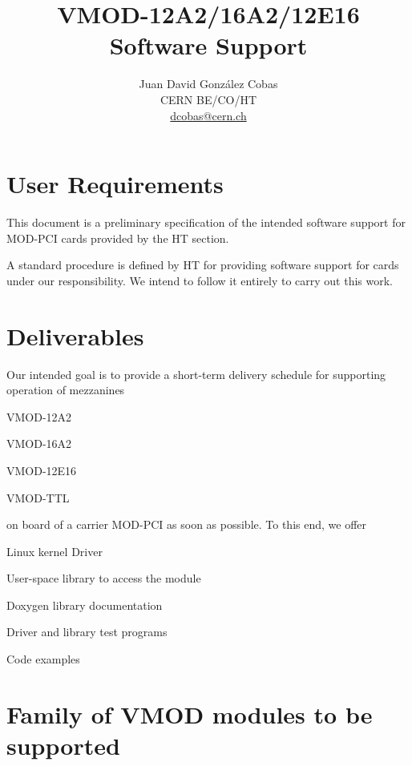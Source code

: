 \documentclass[11pt,a4paper]{article}
\title{VMOD-12A2/16A2/12E16 \\
		Software Support}
\author{%
	Juan David Gonz\'alez Cobas\\
	CERN BE/CO/HT\\
	\url{dcobas@cern.ch}}
\begin{document}
\maketitle

\section{User Requirements}

  This document is a preliminary specification of the intended software
  support for MOD-PCI cards provided by the HT section.

  A standard procedure is defined by HT for providing software
  support for cards under our responsibility. We intend to follow it
  entirely to carry out this work.

\section{Deliverables}

Our intended goal is to provide a short-term delivery schedule for
supporting operation of mezzanines 
\begin{compactitem}
\item VMOD-12A2
\item VMOD-16A2
\item VMOD-12E16
\item VMOD-TTL
\end{compactitem}
on board of a carrier MOD-PCI as soon as possible. To this end, 
we offer

\begin{compactitem}
\item Linux kernel Driver
\item User-space library to access the module
\item Doxygen library documentation
\item Driver and library test programs
\item Code examples
\end{compactitem}

\section{Family of VMOD modules to be supported}
\end{document}
